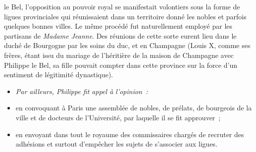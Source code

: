 \documentclass[french,twoside]{book} %
\newlength{\listmod}
\newcommand{\listhead}[1]{\hspace{-1\listmod}\emph{#1}}
\begin{document}
\label{p13} le Bel, l’opposition au pouvoir royal se manifestait volontiers sous la forme de ligues provinciales qui réunissaient dans un territoire donné les nobles et parfois quelques bonnes villes. Le même procédé fut naturellement employé par les partisans de \emph{Madame Jeanne}. Des réunions de cette sorte eurent lieu dans le duché de Bourgogne par les soins du duc, et en Champagne (Louis X, comme ses frères, étant issu du mariage de l’héritière de la maison de Champagne avec Philippe le Bel, sa fille pouvait compter dans cette province sur la force d’un sentiment de légitimité dynastique).\par

\begin{itemize}[itemsep=0pt,]
\item[]\listhead{Par ailleurs, Philippe fit appel à l’opinion :}
\item en convoquant à Paris une assemblée de nobles, de prélats, de bourgeois de la ville et de docteurs de l’Université, par laquelle il se fit approuver ;
\item en envoyant dans tout le royaume des commissaires chargés de recruter des adhésions et surtout d’empêcher les sujets de s’associer aux ligues.
\end{itemize}
\end{document}
